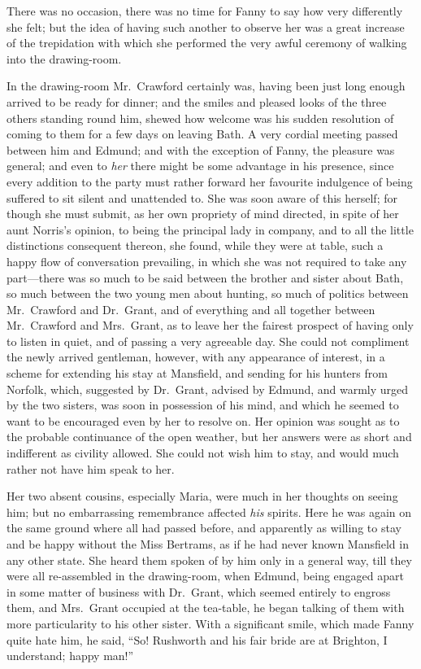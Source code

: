 \documentclass{article}
\begin{document}
There was no occasion, there was no time for Fanny
to say how very differently she felt; but the idea
of having such another to observe her was a great
increase of the trepidation with which she performed
the very awful ceremony of walking into the drawing-room.

In the drawing-room Mr.\ Crawford certainly was, having been
just long enough arrived to be ready for dinner; and the
smiles and pleased looks of the three others standing
round him, shewed how welcome was his sudden resolution
of coming to them for a few days on leaving Bath.
A very cordial meeting passed between him and Edmund;
and with the exception of Fanny, the pleasure was general;
and even to \emph{her} there might be some advantage in
his presence, since every addition to the party must
rather forward her favourite indulgence of being suffered
to sit silent and unattended to.  She was soon aware
of this herself; for though she must submit, as her
own propriety of mind directed, in spite of her aunt
Norris's opinion, to being the principal lady in company,
and to all the little distinctions consequent thereon,
she found, while they were at table, such a happy flow
of conversation prevailing, in which she was not required
to take any part---there was so much to be said between
the brother and sister about Bath, so much between
the two young men about hunting, so much of politics
between Mr.\ Crawford and Dr.\ Grant, and of everything
and all together between Mr.\ Crawford and Mrs.\ Grant,
as to leave her the fairest prospect of having only to
listen in quiet, and of passing a very agreeable day.
She could not compliment the newly arrived gentleman,
however, with any appearance of interest, in a scheme
for extending his stay at Mansfield, and sending for his
hunters from Norfolk, which, suggested by Dr.\ Grant,
advised by Edmund, and warmly urged by the two sisters,
was soon in possession of his mind, and which he seemed
to want to be encouraged even by her to resolve on.
Her opinion was sought as to the probable continuance
of the open weather, but her answers were as short
and indifferent as civility allowed.  She could not wish
him to stay, and would much rather not have him speak
to her.

Her two absent cousins, especially Maria, were much in her
thoughts on seeing him; but no embarrassing remembrance
affected \emph{his} spirits.  Here he was again on the same
ground where all had passed before, and apparently as
willing to stay and be happy without the Miss Bertrams,
as if he had never known Mansfield in any other state.
She heard them spoken of by him only in a general way,
till they were all re-assembled in the drawing-room,
when Edmund, being engaged apart in some matter of business
with Dr.\ Grant, which seemed entirely to engross them,
and Mrs.\ Grant occupied at the tea-table, he began talking
of them with more particularity to his other sister.
With a significant smile, which made Fanny quite hate him,
he said, ``So!  Rushworth and his fair bride are at Brighton,
I understand; happy man!''
\end{document}
